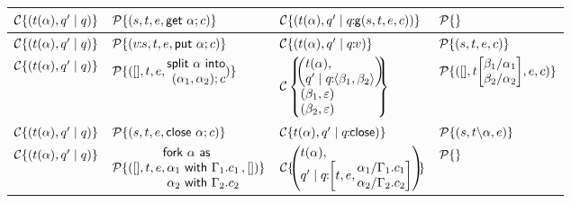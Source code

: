 \documentclass[11pt]{article}
\newcommand{\<}{\langle}
\renewcommand{\>}{\rangle}
\begin{document}
\begin{table}
\begin{center}
\begin{tabular}{|l|l||l|l|} \hline
${\cal C}\{ (t(\alpha), q'\mid q) \} $ & ${\cal P}\{ (s,t,e,{\sf get}~\alpha;c) \}$ 
   & ${\cal C}\{ (t(\alpha),q' \mid q\!\!:\!\!{\sf g}(s,t,e,c)) \}$ & ${\cal P}\{ \}$ \\ \hline
${\cal C}\{ (t(\alpha),q' \mid q)\}$ & ${\cal P}\{ (v\!\!:\!\!s,t,e,{\sf put}~\alpha;c) \}$ & 
${\cal C}\{ (t(\alpha),q' \mid q\!\!:\!\!v)\} $ & ${\cal P}\{ (s,t,e,c) \}$ \\ \hline
${\cal C}\{ (t(\alpha), q' \mid q) \}$ & ${\cal P}\{ ([],t,e,\!\!\!\begin{array}[c]{r}{\sf split}~\alpha~{\sf into}\\ ~(\alpha_1,\alpha_2); c \end{array}\!\!\!) \} $ &
         ${\cal C}\left\{ \!\!\!\begin{array}[c]{l} \!\!\left(\!\!\!\begin{array}[c]{l} t(\alpha), \\ q' \mid q\!\!:\!\! \< \beta_1,\beta_2 \>\end{array} \!\!\!\right) \!\!\\ (\beta_1,\varepsilon) \\ (\beta_2,\varepsilon) \end{array} \!\!\!\!\right\}$ & ${\cal P}\{ ([],t \!\left[ \!\!\!\begin{array}{l} \beta_1/\alpha_1\\ \beta_2/\alpha_2 \end{array} \!\!\!\right]\!,e,c) \}$ \\ \hline
${\cal C}\{ (t(\alpha),q'\mid q) \}$ & ${\cal P}\{ (s,t,e,{\sf close}~\alpha;c)\} $ & ${\cal C}\{ t(\alpha),q' \mid q\!\!:\!\!{\sf close}) \}$ & ${\cal P}\{ (s,t\backslash\alpha,e)\}$ \\ \hline
${\cal C}\{ (t(\alpha),q' \mid q) \}$ & ${\cal P}\{ ([],t,e, \!\!\!\!\!\begin{array}[c]{l}{\sf fork} ~ \alpha~{\sf as} \\
                           ~\alpha_1~{\sf with}~\Gamma_1. c_1 \\
                           ~\alpha_2~{\sf with}~\Gamma_2. c_2  \end{array}\!\!,[]) \} $ 
              & ${\cal C}\{\!\! \left(\!\!\!\begin{array}{l} t(\alpha),\\ q'\mid q\!\!:\!\!\left[t,e,\!\!\!\begin{array}[c]{l} \alpha_1/\Gamma_1. c_1 \\ \alpha_2/\Gamma_2. c_2 \end{array} \!\!\!\right] \end{array}\!\!\!\right)\!\!\}$ & ${\cal P}\{\}$ \\ \hline

\end{tabular}
\end{center}
\end{table}
\end{document}
